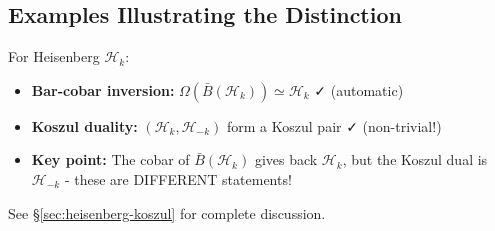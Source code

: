 \subsection{Examples Illustrating the Distinction}

\begin{example}\label{ex:heisenberg-koszul-vs-barcobar}
For Heisenberg $\mathcal{H}_k$:
\begin{itemize}
\item \textbf{Bar-cobar inversion:} $\Omega(\bar{B}(\mathcal{H}_k)) \simeq \mathcal{H}_k$ ✓ (automatic)
\item \textbf{Koszul duality:} $(\mathcal{H}_k, \mathcal{H}_{-k})$ form a Koszul pair ✓ (non-trivial!)
\item \textbf{Key point:} The cobar of $\bar{B}(\mathcal{H}_k)$ gives back $\mathcal{H}_k$, but the Koszul dual is $\mathcal{H}_{-k}$ - these are DIFFERENT statements!
\end{itemize}

See \S\ref{sec:heisenberg-koszul} for complete discussion.
\end{example}
